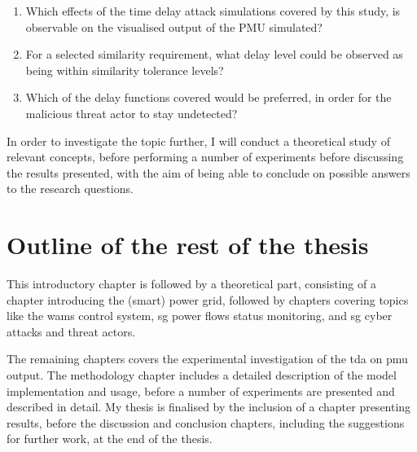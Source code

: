 \begin{enumerate}
    \item Which effects of the time delay attack simulations covered by this study, is observable on the visualised output of the PMU simulated?
    \item For a selected similarity requirement, what delay level could be observed as being within similarity tolerance levels?
    \item Which of the delay functions covered would be preferred, in order for the malicious threat actor to stay undetected?    

\end{enumerate}

In order to investigate the topic further, I will conduct a theoretical study of relevant concepts, before performing a number of experiments before discussing the results presented, with the aim of being able to conclude on possible answers to the research questions. 



\section{Outline of the rest of the thesis}



This introductory chapter is followed by a theoretical part, consisting of a chapter introducing the (smart) power grid, followed by chapters covering topics like the \acrshort{wams} control system, \acrfull{sg} power flows status monitoring, and \acrlong{sg} cyber attacks and threat actors.  

The remaining chapters covers the experimental investigation of the \acrlong{tda} on \acrlong{pmu} output. The methodology chapter includes a detailed description of the model implementation and usage, before a number of experiments are presented and described in detail.
My thesis is finalised by the inclusion of a chapter presenting results, before the discussion and conclusion chapters, including the suggestions for further work, at the end of the thesis. \\


